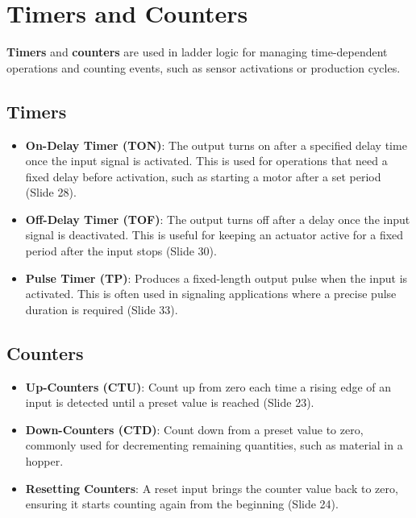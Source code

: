 \documentclass[
  14pt,
  a4paper,
  numbers=noendperiod,
  headinclude=true,
  footinclude=true,
  DIV=calc]{scrreprt}
\providecommand{\tightlist}{%
  \setlength{\itemsep}{0pt}\setlength{\parskip}{0pt}}\usepackage{longtable,booktabs,array}
\begin{document}
\section{Timers and Counters}\label{timers-and-counters}

\textbf{Timers} and \textbf{counters} are used in ladder logic for
managing time-dependent operations and counting events, such as sensor
activations or production cycles.

\subsection{Timers}\label{timers}

\begin{itemize}
\tightlist
\item
  \textbf{On-Delay Timer (TON)}: The output turns on after a specified
  delay time once the input signal is activated. This is used for
  operations that need a fixed delay before activation, such as starting
  a motor after a set period (Slide 28).
\item
  \textbf{Off-Delay Timer (TOF)}: The output turns off after a delay
  once the input signal is deactivated. This is useful for keeping an
  actuator active for a fixed period after the input stops (Slide 30).
\item
  \textbf{Pulse Timer (TP)}: Produces a fixed-length output pulse when
  the input is activated. This is often used in signaling applications
  where a precise pulse duration is required (Slide 33).
\end{itemize}

\subsection{Counters}\label{counters}

\begin{itemize}
\tightlist
\item
  \textbf{Up-Counters (CTU)}: Count up from zero each time a rising edge
  of an input is detected until a preset value is reached (Slide 23).
\item
  \textbf{Down-Counters (CTD)}: Count down from a preset value to zero,
  commonly used for decrementing remaining quantities, such as material
  in a hopper.
\item
  \textbf{Resetting Counters}: A reset input brings the counter value
  back to zero, ensuring it starts counting again from the beginning
  (Slide 24).
\end{itemize}
\end{document}
